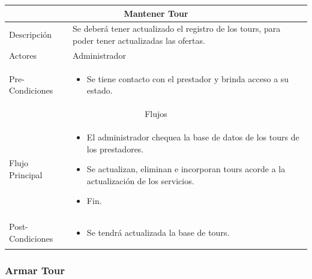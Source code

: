 \documentclass[12pt,a4paper]{article}
\newenvironment{myitemize}
{\begin{itemize}[leftmargin=*,noitemsep,topsep=0pt]}{\end{itemize}}
\newenvironment{caseuse}
{\begin{center}\begin{tabular}{|l|p{10cm}|}}{\end{tabular}\end{center}}
\begin{document}
			\begin{caseuse}
				\hline
				\multicolumn{2}{|c|}{Mantener Tour} \\ \hline

				Descripción &  Se deberá tener actualizado el registro de los tours, para poder tener actualizadas las ofertas.\\ \hline

				Actores &  Administrador\\ \hline

				Pre-Condiciones & 
					\begin{myitemize}
						\item Se tiene contacto con el prestador y brinda acceso a su estado.
					\end{myitemize} \\ \hline

				\multicolumn{2}{|c|}{Flujos} \\ \hline

				Flujo Principal &
					\begin{myitemize}
						\item El administrador chequea la base de datos de los tours de los prestadores.
						\item Se actualizan, eliminan e incorporan tours acorde a la actualización de los servicios.
						\item Fin.
					\end{myitemize} \\ \hline

				Post-Condiciones &
					\begin{myitemize}
						\item Se tendrá actualizada la base de tours.
					\end{myitemize}\\ \hline
			\end{caseuse}	


		\subsubsection{Armar Tour}
\end{document}
